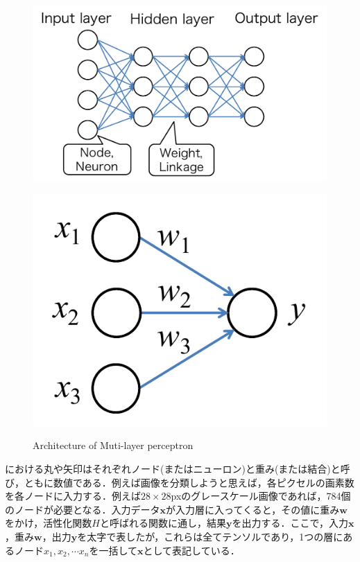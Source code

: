\begin{figure}[H]
	\centering
	\begin{minipage}[b]{0.4\columnwidth}
		\centering
		\includegraphics[width=1.2\linewidth]{figure/Review/MLP}
		\label{fig:mlp}
	\end{minipage}
	\begin{minipage}[b]{0.4\columnwidth}
		\centering
		\includegraphics[width=0.7\linewidth]{figure/Review/simple_perceptron}
		\label{fig:perceptron}
	\end{minipage}
	\caption{Architecture of Muti-layer perceptron}
\end{figure}

における丸や矢印はそれぞれノード(またはニューロン)と重み(または結合)と呼び，ともに数値である．例えば画像を分類しようと思えば，各ピクセルの画素数を各ノードに入力する．例えば$28 \times 28$pxのグレースケール画像であれば，784個のノードが必要となる．入力データ$\bm {x}$が入力層に入ってくると，その値に重み$\bm {w}$をかけ，活性化関数$H$と呼ばれる関数に通し，結果$\bm{y}$を出力する．ここで，入力$\bm{x}$，重み$\bm{w}$，出力$\bm{y}$を太字で表したが，これらは全てテンソルであり，1つの層にあるノード$x_1, x_2, \cdots x_n$を一括して$\bm {x}$として表記している．

